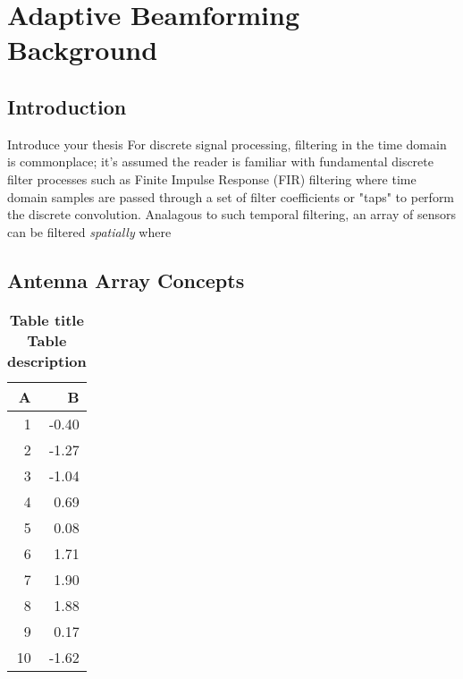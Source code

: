 \chapter{Adaptive Beamforming Background}
\label{chap:abf_background}

\section{Introduction}

Introduce your thesis \citep{A,B}
For discrete signal processing, filtering in the time domain is commonplace; it's assumed the reader is familiar with fundamental discrete filter processes such as Finite Impulse Response (FIR) filtering where time domain samples are passed through a set of filter coefficients or "taps" to perform the discrete convolution. Analagous to such temporal filtering, an array of sensors can be filtered \emph{spatially} where

\section{Antenna Array Concepts}





\begin{table}[ht]
\centering
\begin{tabular}{rr}
  \hline
A & B \\
  \hline
  1 & -0.40 \\
    2 & -1.27 \\
    3 & -1.04 \\
    4 & 0.69 \\
    5 & 0.08 \\
    6 & 1.71 \\
    7 & 1.90 \\
    8 & 1.88 \\
    9 & 0.17 \\
   10 & -1.62 \\
   \hline
\end{tabular}
\caption{\bf{ Table title } Table description}
\label{tab:rtab1}
\end{table}



